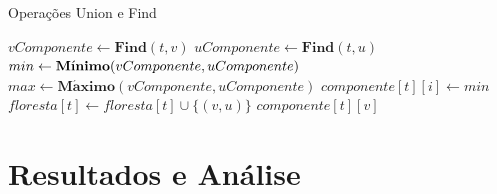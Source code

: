 \documentclass[12pt]{article}
\begin{document}
\begin{algorithm}[h]
    \DontPrintSemicolon
    \caption{Operações Union e Find}
    {
        $vComponente \gets  \textbf{Find}(t,v)$\;
        $uComponente \gets  \textbf{Find}(t,u)$\;
        $min\gets\textbf{M}\acute{\textbf{\i}}\textbf{nimo}(vComponente,uComponente)$\;
		$max\gets\textbf{M}\acute{\textbf{a}}\textbf{ximo}(vComponente,uComponente)$\;
        {
            {
                {
                    $componente[t][i] \gets min$\;
                }
            }
            $floresta[t] \gets floresta[t] \cup \{(v,u)\}$\;
        }
    }
    {
        \Return $componente[t][v]$\;
    }
\end{algorithm}

\section{Resultados e Análise}

{\color{gray}\lipsum[1]}
\end{document}
